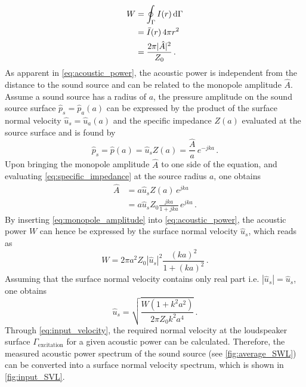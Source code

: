 \begin{align}
	W &= \oint_{\Gamma} I(r) \dif\Gamma \\
	  &= \bar{I}(r)\,4\pi r^2 \\
	  &= \frac{2\pi |\hat{A}|^2}{Z_0}\,. \label{eq:acoustic_power}
\end{align}
As apparent in \cref{eq:acoustic_power}, the acoustic power is independent from the distance to the sound source and can be related to the monopole amplitude $\hat{A}$. Assume a sound source has a radius of $a$, the pressure amplitude on the sound source surface $\hat{p}_s = \hat{p}_a(a)$ can be expressed by the product of the surface normal velocity $\hat{u}_s = \hat{u}_a(a)$ and the specific impedance $Z(a)$ evaluated at the source surface and is found by
\begin{equation}
	\hat{p}_s = \hat{p}(a) = \hat{u}_s Z(a) = \frac{\hat{A}}{a}\,e^{-jka}\,.
\end{equation}
Upon bringing the monopole amplitude $\hat{A}$ to one side of the equation, and evaluating \cref{eq:specific_impedance} at the source radius $a$, one obtains
\begin{align}
	\hat{A} &= a\hat{u}_s Z(a)\,e^{jka} \\
			&= a\hat{u}_s Z_0 \frac{jka}{1+jka}\,e^{jka}\,. \label{eq:monopole_amplitude}
\end{align}
By inserting \cref{eq:monopole_amplitude} into \cref{eq:acoustic_power}, the acoustic power $W$ can hence be expressed by the surface normal velocity $\hat{u}_s$, which reads as
\begin{equation}
	W = 2\pi a^2 Z_0 \left|\hat{u}_s\right|^2\frac{(ka)^2}{1+(ka)^2} \,.
\end{equation}
Assuming that the surface normal velocity contains only real part i.e. $\left|\hat{u}_s\right| = \hat{u}_s$, one obtains
\begin{equation}
	\hat{u}_s = \sqrt{\frac{W(1 + k^2a^2)}{2\pi Z_0 k^2a^4}}\,. \label{eq:input_velocity}
\end{equation}
Through \cref{eq:input_velocity}, the required normal velocity at the loudspeaker surface $\Gamma_{\text{excitation}}$ for a given acoustic power can be calculated. Therefore, the measured acoustic power spectrum of the sound source (see \cref{fig:average_SWL}) can be converted into a surface normal velocity spectrum, which is shown in \cref{fig:input_SVL}.

